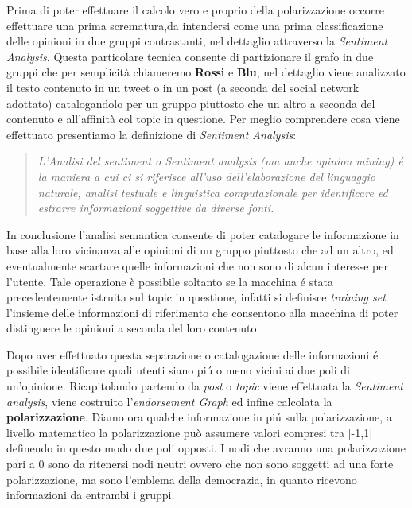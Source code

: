 Prima di poter effettuare il calcolo vero e proprio della polarizzazione occorre effettuare una prima scrematura,da intendersi come una prima classificazione delle opinioni in due gruppi contrastanti, nel dettaglio attraverso la \textit{Sentiment Analysis}. Questa particolare tecnica consente di partizionare il grafo in due gruppi che per semplicità chiameremo \textbf{Rossi} e \textbf{Blu}, nel dettaglio viene analizzato il testo contenuto in un tweet o in un post (a seconda del social network adottato) catalogandolo per un gruppo piuttosto che un altro a seconda del contenuto e all'affinità col topic in questione. 
Per meglio comprendere cosa viene effettuato presentiamo la definizione di \textit{Sentiment Analysis}:
\begin{quote}
\textit{L'Analisi del sentiment o Sentiment analysis (ma anche opinion mining) \'e la maniera a cui ci si riferisce all'uso dell'elaborazione del linguaggio naturale, analisi testuale e linguistica computazionale per identificare ed estrarre informazioni soggettive da diverse fonti.} 
\end{quote}

In conclusione l'analisi semantica consente di poter catalogare le informazione in base alla loro vicinanza alle opinioni di un gruppo piuttosto che ad un altro, ed eventualmente scartare quelle informazioni che non sono di alcun interesse per l'utente. Tale operazione è possibile soltanto se la macchina \'e stata precedentemente istruita sul topic in questione, infatti si definisce \textit{training set} l'insieme delle informazioni di riferimento che consentono alla macchina di poter distinguere le opinioni a seconda del loro contenuto.

Dopo aver effettuato questa separazione o catalogazione delle informazioni \'e possibile identificare quali utenti siano pi\'u o meno vicini ai due poli di un'opinione. Ricapitolando partendo da \textit{post} o \textit{topic} viene effettuata la \textit{Sentiment analysis}, viene costruito l'\textit{endorsement Graph} ed infine calcolata la \textbf{polarizzazione}.
Diamo ora qualche informazione in pi\'u sulla polarizzazione, a livello matematico la polarizzazione può assumere valori compresi tra [-1,1] definendo in questo modo due poli opposti. I nodi che avranno una polarizzazione pari a 0 sono da ritenersi nodi neutri ovvero che non sono soggetti ad una forte polarizzazione, ma sono l'emblema della democrazia, in quanto ricevono informazioni da entrambi i gruppi.

